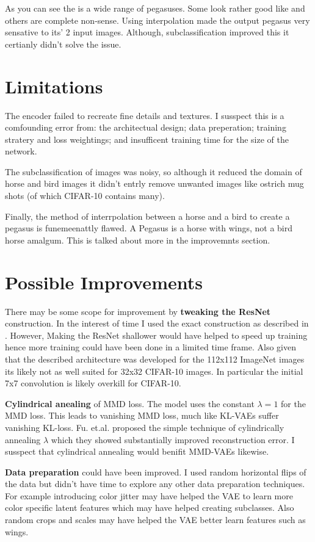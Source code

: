 \documentclass{article}
\begin{document}
As you can see the is a wide range of pegasuses. Some look rather good like and others are complete non-sense. Using interpolation made the output pegasus very sensative to its' 2 input images. Although, subclassification improved this it certianly didn't solve the issue.  

\section{Limitations}
The encoder failed to recreate fine details and textures. I susspect this is a comfounding error from: the architectual design; data preperation; training stratery and loss weightings; and insufficent training time for the size of the network.

The subclassification of images was noisy, so although it reduced the domain of horse and bird images it didn't entrly remove unwanted images like ostrich mug shots (of which CIFAR-10 contains many). 

Finally, the method of interrpolation between a horse and a bird to create a pegasus is funemeenattly flawed. A Pegasus is a horse with wings, not a bird horse amalgum. This is talked about more in the improvemnts section.  



\section{Possible Improvements}
There may be some scope for improvement by \textbf{tweaking the ResNet} construction. In the interest of time I used the exact construction as described in \cite{ResNet}. However, Making the ResNet shallower would have helped to speed up training hence more training could have been done in a limited time frame. Also given that the described architecture was developed for the 112x112 ImageNet images its likely not as well suited for 32x32 CIFAR-10 images. In particular the initial 7x7 convolution is likely overkill for CIFAR-10.

\textbf{Cylindrical anealing} of MMD loss. The model uses the constant $\lambda=1$ for the MMD loss. This leads to vanishing MMD loss, much like KL-VAEs suffer vanishing KL-loss. Fu. et.al. \cite{cylindricalAnnealing} proposed the simple technique of cylindrically annealing $\lambda$ which they showed substantially improved reconstruction error. I susspect that cylindrical annealing would benifit MMD-VAEs likewise.

\textbf{Data preparation} could have been improved. I used random horizontal flips of the data but didn't have time to explore any other data preparation techniques. For example introducing color jitter may have helped the VAE to learn more color specific latent features which may have helped creating subclasses. Also random crops and scales may have helped the VAE better learn features such as wings.   
\end{document}
